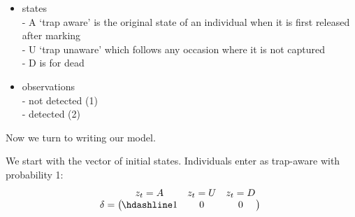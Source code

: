 \documentclass[
  12pt,
]{krantz}
\begin{document}
\begin{itemize}
\item
  states\\
  - A `trap aware' is the original state of an individual when it is first released after marking\\
  - U `trap unaware' which follows any occasion where it is not captured\\
  - D is for dead
\item
  observations\\
  - not detected (1)\\
  - detected (2)
\end{itemize}

Now we turn to writing our model.

We start with the vector of initial states. Individuals enter as trap-aware with probability 1:
\[\begin{matrix}
& \\
\mathbf{\delta} =
\left ( \vphantom{ \begin{matrix} 12 \end{matrix} } \right .
\end{matrix}
\hspace{-1.2em}
\begin{matrix}
z_t=A & z_t=U & z_t=D \\ \hdashline
1 & 0 & 0\\
\end{matrix}
\hspace{-0.2em}
\begin{matrix}
& \\
\left . \vphantom{ \begin{matrix} 12 \end{matrix} } \right )
\begin{matrix}
\end{matrix}
\end{matrix}\]
\end{document}
